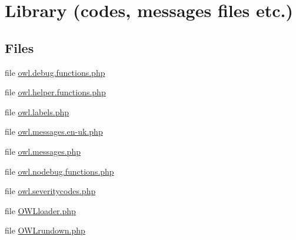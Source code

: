 \section{Library (codes, messages files etc.)}
\label{group__OWL__LIBRARY}
\subsection*{Files}
\begin{DoxyCompactItemize}
\item 
file \hyperlink{owl_8debug_8functions_8php}{owl.debug.functions.php}
\item 
file \hyperlink{owl_8helper_8functions_8php}{owl.helper.functions.php}
\item 
file \hyperlink{owl_8labels_8php}{owl.labels.php}
\item 
file \hyperlink{owl_8messages_8en-uk_8php}{owl.messages.en-\/uk.php}
\item 
file \hyperlink{owl_8messages_8php}{owl.messages.php}
\item 
file \hyperlink{owl_8nodebug_8functions_8php}{owl.nodebug.functions.php}
\item 
file \hyperlink{owl_8severitycodes_8php}{owl.severitycodes.php}
\item 
file \hyperlink{OWLloader_8php}{OWLloader.php}
\item 
file \hyperlink{OWLrundown_8php}{OWLrundown.php}
\end{DoxyCompactItemize}
